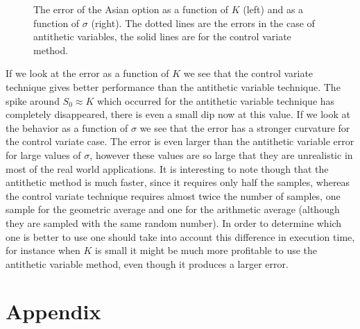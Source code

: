 \documentclass[11pt,a4paper]{article}
\begin{document}
\begin{figure}[H]
  \centering
  \caption{The error of the Asian option as a function of $K$ (left) and as a function of $\sigma$ (right). The dotted lines are the errors in the case of antithetic variables, the solid lines are for the control variate method.}
  \label{fig:asianvar}
\end{figure}

If we look at the error as a function of $K$ we see that the control variate technique gives better performance than the antithetic variable technique. The spike around $S_0 \approx K$ which occurred for the antithetic variable technique has completely disappeared, there is even a small dip now at this value. If we look at the behavior as a function of $\sigma$ we see that the error has a stronger curvature for the control variate case. The error is even larger than the antithetic variable error for large values of $\sigma$, however these values are so large that they are unrealistic in most of the real world applications. It is interesting to note though that the antithetic method is much faster, since it requires only half the samples, whereas the control variate technique requires almost twice the number of samples, one sample for the geometric average and one for the arithmetic average (although they are sampled with the same random number). In order to determine which one is better to use one should take into account this difference in execution time, for instance when $K$ is small it might be much more profitable to use the antithetic variable method, even though it produces a larger error.

\newpage

\section{Appendix}
\end{document}
